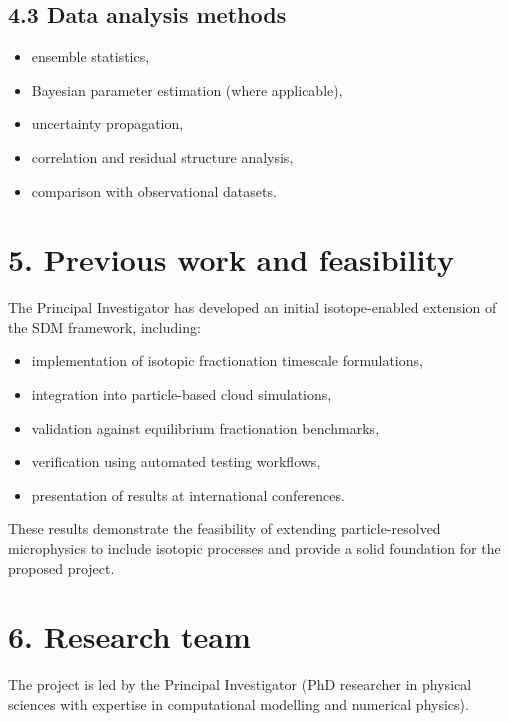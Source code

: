 \documentclass[11pt,a4paper]{article}
\begin{document}
\subsection*{4.3 Data analysis methods}
\begin{itemize}
\item ensemble statistics,


\item Bayesian parameter estimation (where applicable),


\item uncertainty propagation,


\item correlation and residual structure analysis,


\item comparison with observational datasets.


\end{itemize}
\section*{5. Previous work and feasibility}
The Principal Investigator has developed an initial isotope-enabled extension of the SDM framework, including:

\begin{itemize}
\item implementation of isotopic fractionation timescale formulations,


\item integration into particle-based cloud simulations,


\item validation against equilibrium fractionation benchmarks,


\item verification using automated testing workflows,


\item presentation of results at international conferences.


\end{itemize}
These results demonstrate the feasibility of extending particle-resolved microphysics to include isotopic processes and provide a solid foundation for the proposed project.

\section*{6. Research team}
The project is led by the Principal Investigator (PhD researcher in physical sciences with expertise in computational modelling and numerical physics).
\end{document}
